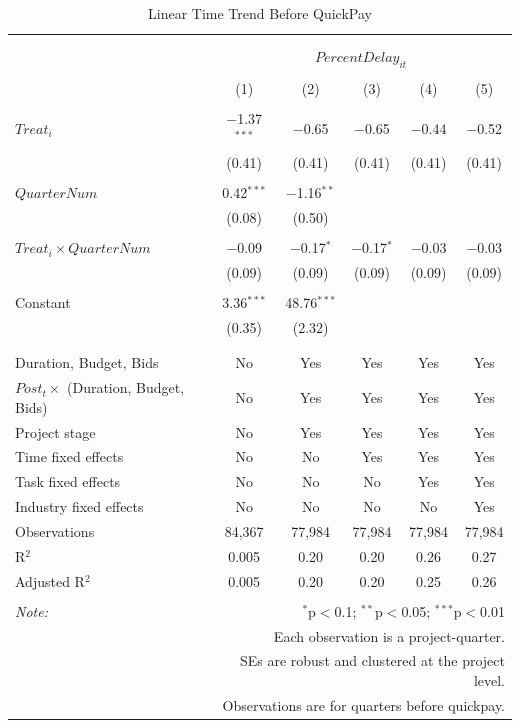 \documentclass[
]{article}
\begin{document}
\begin{table}[H] \centering 
  \caption{Linear Time Trend Before QuickPay} 
  \label{} 
\small 
\begin{tabular}{@{\extracolsep{-2pt}}lccccc} 
\\[-1.8ex]\hline 
\hline \\[-1.8ex] 
\\[-1.8ex] & \multicolumn{5}{c}{$PercentDelay_{it}$} \\ 
\\[-1.8ex] & (1) & (2) & (3) & (4) & (5)\\ 
\hline \\[-1.8ex] 
 $Treat_i$ & $-$1.37$^{***}$ & $-$0.65 & $-$0.65 & $-$0.44 & $-$0.52 \\ 
  & (0.41) & (0.41) & (0.41) & (0.41) & (0.41) \\ 
  & & & & & \\ 
 $QuarterNum$ & 0.42$^{***}$ & $-$1.16$^{**}$ &  &  &  \\ 
  & (0.08) & (0.50) &  &  &  \\ 
  & & & & & \\ 
 $Treat_i \times QuarterNum$ & $-$0.09 & $-$0.17$^{*}$ & $-$0.17$^{*}$ & $-$0.03 & $-$0.03 \\ 
  & (0.09) & (0.09) & (0.09) & (0.09) & (0.09) \\ 
  & & & & & \\ 
 Constant & 3.36$^{***}$ & 48.76$^{***}$ &  &  &  \\ 
  & (0.35) & (2.32) &  &  &  \\ 
  & & & & & \\ 
\hline \\[-1.8ex] 
Duration, Budget, Bids & No & Yes & Yes & Yes & Yes \\ 
$Post_t \times$  (Duration, Budget, Bids) & No & Yes & Yes & Yes & Yes \\ 
Project stage & No & Yes & Yes & Yes & Yes \\ 
Time fixed effects & No & No & Yes & Yes & Yes \\ 
Task fixed effects & No & No & No & Yes & Yes \\ 
Industry fixed effects & No & No & No & No & Yes \\ 
Observations & 84,367 & 77,984 & 77,984 & 77,984 & 77,984 \\ 
R$^{2}$ & 0.005 & 0.20 & 0.20 & 0.26 & 0.27 \\ 
Adjusted R$^{2}$ & 0.005 & 0.20 & 0.20 & 0.25 & 0.26 \\ 
\hline 
\hline \\[-1.8ex] 
\textit{Note:}  & \multicolumn{5}{r}{$^{*}$p$<$0.1; $^{**}$p$<$0.05; $^{***}$p$<$0.01} \\ 
 & \multicolumn{5}{r}{Each observation is a project-quarter.} \\ 
 & \multicolumn{5}{r}{SEs are robust and clustered at the project level.} \\ 
 & \multicolumn{5}{r}{Observations are for quarters before quickpay.} \\ 
\end{tabular} 
\end{table}
\end{document}
